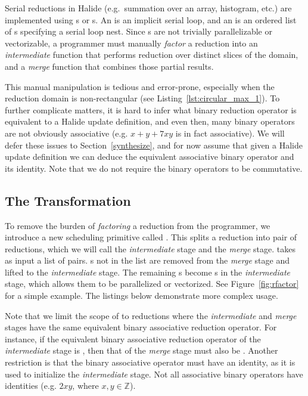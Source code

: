 
Serial reductions in Halide (e.g.\ summation over an array, histogram, etc.) are implemented using s or s. An  is an implicit serial loop, and an  is an ordered list of s specifying a serial loop nest. Since s are not trivially parallelizable or vectorizable, a programmer must manually \emph{factor} a reduction into an \emph{intermediate} function that performs reduction over distinct slices of the domain, and a \emph{merge} function that combines those partial results.

This manual manipulation is tedious and error-prone, especially when the reduction domain is non-rectangular (see Listing~\ref{lst:circular_max_1}). To further complicate matters, it is hard to infer what binary reduction operator is equivalent to a Halide update definition, and even then, many binary operators are not obviously associative (e.g. $x + y + 7xy$ is in fact associative). We will defer these issues to Section~\ref{synthesize}, and for now assume that given a Halide update definition we can deduce the equivalent associative binary operator and its identity. Note that we do not require the binary operators to be commutative.

\subsection{The  Transformation}

To remove the burden of \emph{factoring} a reduction from the programmer, we introduce a new scheduling primitive called . This splits a reduction into pair of reductions, which we will call the \emph{intermediate} stage and the \emph{merge} stage.  takes as input a list of  pairs. s not in the list are removed from the \emph{merge} stage and lifted to the \emph{intermediate} stage. The remaining s become s in the \emph{intermediate} stage, which allows them to be parallelized or vectorized. See Figure~\ref{fig:rfactor} for a simple example. The listings below demonstrate more complex usage.

 Note that we limit the scope of  to reductions where the \emph{intermediate} and \emph{merge} stages have the same equivalent binary associative reduction operator. For instance, if the equivalent binary associative reduction operator of the \emph{intermediate} stage is , then that of the \emph{merge} stage must also be . Another restriction is that the binary associative operator must have an identity, as it is used to initialize the \emph{intermediate} stage. Not all associative binary operators have identities (e.g. $2xy$, where $x, y \in \mathds{Z}$).


